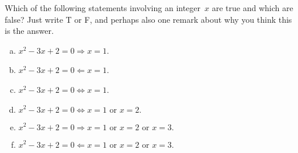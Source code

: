 Which of the following statements involving an integer~$x$ are true and which are false? Just write T or F, and perhaps also one remark about why you think this is the answer.

\setlength{\linewidth}{15cm}

\begin{multicols}{2}
\begin{enumerate}[(a)]
\item $x^2-3x+2=0\Rightarrow x=1$.
\item $x^2-3x+2=0\Leftarrow x=1$.
\item $x^2-3x+2=0\iff x=1$.
\item $x^2-3x+2=0\iff x=1\mbox{ or }x=2.$
\item $x^2-3x+2=0\Rightarrow x=1\mbox{ or }x=2\mbox{ or }x=3.$
\item $x^2-3x+2=0\Leftarrow x=1\mbox{ or }x=2\mbox{ or }x=3.$
\end{enumerate}
\end{multicols}
